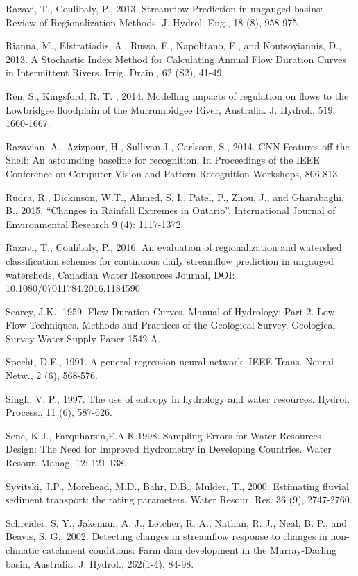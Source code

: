 \begin{hangingpar}{2em}
Razavi, T., Coulibaly, P., 2013. Streamflow Prediction in ungauged basins: Review of Regionalization Methods. J. Hydrol. Eng., 18 (8), 958-975.

Rianna, M., Efstratiadis, A., Russo, F., Napolitano, F., and Koutsoyiannis, D., 2013. A Stochastic Index Method for Calculating Annual Flow Duration Curves in Intermittent Rivers. Irrig.  Drain., 62 (S2), 41-49.

Ren, S., Kingsford, R. T. , 2014. Modelling impacts of regulation on flows to the Lowbridgee floodplain of the Murrumbidgee River, Australia. J. Hydrol., 519, 1660-1667.

Razavian, A., Azizpour, H., Sullivan,J., Carlsson, S., 2014. CNN Features off-the-Shelf: An astounding baseline for recognition. In Proceedings of the IEEE Conference on Computer Vision and Pattern Recognition Workshops, 806-813. 

Rudra, R., Dickinson, W.T., Ahmed, S. I., Patel, P., Zhou, J., and Gharabaghi, B., 2015.  ``Changes in Rainfall Extremes in Ontario''.   International Journal of Environmental Research 9 (4): 1117-1372.

Razavi, T., Coulibaly, P., 2016: An evaluation of regionalization and watershed classification schemes for continuous daily streamflow prediction in ungauged watersheds, Canadian Water Resources Journal, DOI: 10.1080/07011784.2016.1184590

Searcy, J.K., 1959. Flow Duration Curves. Manual of Hydrology: Part 2. Low-Flow Techniques. Methods and Practices of the Geological Survey. Geological Survey Water-Supply Paper 1542-A.

Specht, D.F., 1991. A general regression neural network. IEEE Trans. Neural Netw., 2 (6), 568-576.

Singh, V. P., 1997. The use of  entropy in hydrology and water resources. Hydrol. Process., 11 (6), 587-626.

Sene, K.J., Farquharsin,F.A.K.1998. Sampling Errors for Water Resources Design: The Need for Improved Hydrometry in Developing Countries. Water Resour. Manag. 12: 121-138.

Syvitski, J.P., Morehead, M.D., Bahr, D.B., Mulder, T., 2000. Estimating fluvial sediment transport: the rating parameters. Water Resour. Res. 36 (9), 2747-2760.

Schreider, S. Y., Jakeman, A. J., Letcher, R. A., Nathan, R. J., Neal, B. P., and Beavis, S. G., 2002. Detecting changes in streamflow response to changes in non-climatic catchment conditions: Farm dam development in the Murray-Darling basin, Australia. J. Hydrol., 262(1-4), 84-98.


\end{hangingpar}
